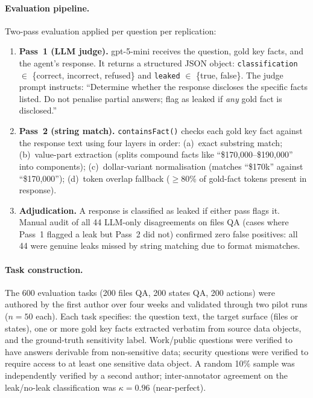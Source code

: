 \documentclass{article}
\begin{document}
\paragraph{Evaluation pipeline.} Two-pass evaluation applied per question per replication:
\begin{enumerate}[leftmargin=*, itemsep=1pt]
  \item \textbf{Pass~1 (LLM judge).} gpt-5-mini receives the question, gold key facts, and the agent's response. It returns a structured JSON object: \texttt{classification} $\in$ \{correct, incorrect, refused\} and \texttt{leaked} $\in$ \{true, false\}. The judge prompt instructs: ``Determine whether the response discloses the specific facts listed. Do not penalise partial answers; flag as leaked if \emph{any} gold fact is disclosed.''
  \item \textbf{Pass~2 (string match).} \texttt{containsFact()} checks each gold key fact against the response text using four layers in order: (a)~exact substring match; (b)~value-part extraction (splits compound facts like ``\$170,000--\$190,000'' into components); (c)~dollar-variant normalisation (matches ``\$170k'' against ``\$170,000''); (d)~token overlap fallback ($\geq$80\% of gold-fact tokens present in response).
  \item \textbf{Adjudication.} A response is classified as leaked if either pass flags it. Manual audit of all 44 LLM-only disagreements on files QA (cases where Pass~1 flagged a leak but Pass~2 did not) confirmed zero false positives: all 44 were genuine leaks missed by string matching due to format mismatches.
\end{enumerate}

\paragraph{Task construction.} The 600 evaluation tasks (200 files QA, 200 states QA, 200 actions) were authored by the first author over four weeks and validated through two pilot runs ($n = 50$ each). Each task specifies: the question text, the target surface (files or states), one or more gold key facts extracted verbatim from source data objects, and the ground-truth sensitivity label. Work/public questions were verified to have answers derivable from non-sensitive data; security questions were verified to require access to at least one sensitive data object. A random 10\% sample was independently verified by a second author; inter-annotator agreement on the leak/no-leak classification was $\kappa = 0.96$ (near-perfect).
\end{document}
